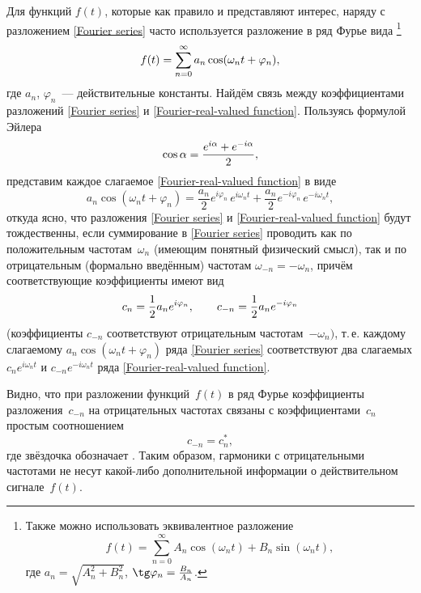 Для  функций $f(t)$, которые как правило и представляют интерес,
наряду с разложением \eqref{Fourier series} часто используется разложение
в ряд Фурье вида%
\footnote{Также можно использовать эквивалентное разложение
\[
f(t)=\sum\limits_{n=0}^{\infty} A_n \cos(\omega_n t) + B_n \sin(\omega_n t),
\]
где $a_n=\sqrt{A_n^2+B_n^2}$, $\tg \varphi_n = \frac{B_n}{A_n}$.}
\begin{equation}
    \eqmark{Fourier-real-valued function}
    f(t)=\sum\limits_{n=0}^{\infty} a_n \cos(\omega_n t+\varphi_n ),
\end{equation}
где $a_n$, $\varphi_n$~--- действительные константы. Найдём связь между
коэффициентами разложений \eqref{Fourier series} и \eqref{Fourier-real-valued function}.
Пользуясь формулой Эйлера
\begin{equation}
    \eqmark{euler}
    \cos\alpha=\frac{e^{i\alpha}+e^{-i\alpha}}{2},
\end{equation}
представим каждое слагаемое \eqref{Fourier-real-valued function} в виде
\begin{equation*}
    a_n\cos(\omega_nt+\varphi_n)=\frac{a_n}{2}e^{i\varphi_n}\,e^{i\omega_n
t}+\frac{a_n}{2}e^{-i\varphi_n}\,e^{-i\omega_n t},
\end{equation*}
откуда ясно, что разложения \eqref{Fourier series} и
\eqref{Fourier-real-valued function} будут тождественны, если суммирование в
\eqref{Fourier series} проводить как по положительным частотам~$\omega_n$
(имеющим понятный физический смысл), так и по отрицательным (формально введённым)
частотам $\omega_{-n}=-\omega_n$, причём соответствующие коэффициенты имеют вид
\begin{equation}
    \eqmark{Fourier-coefficient}
    c_n =\frac{1}{2}a_n e^{i\varphi_n},
    \qquad c_{-n}=\frac{1}{2}a_n e^{-i\varphi_n}
\end{equation}
(коэффициенты $c_{-n}$ соответствуют отрицательным частотам~$-\omega_n)$,
т.\,е. каждому слагаемому $a_n\cos(\omega_nt+\varphi_n)$ ряда \eqref{Fourier series}
соответствуют два слагаемых $c_ne^{i\omega_n t}$ и
$c_{-n}e^{-i\omega_n t}$ ряда \eqref{Fourier-real-valued function}.


Видно, что при разложении  функций~$f(t)$ в ряд Фурье
коэффициенты разложения~$c_{-n}$ на отрицательных
частотах связаны с коэффициентами~$c_n$ простым соотношением
\begin{equation*}
c_{-n}=c_{n}^*,
\end{equation*}
где звёздочка обозначает .
Таким образом, гармоники с отрицательными частотами не несут какой-либо
дополнительной информации о действительном сигнале~$f(t)$.

